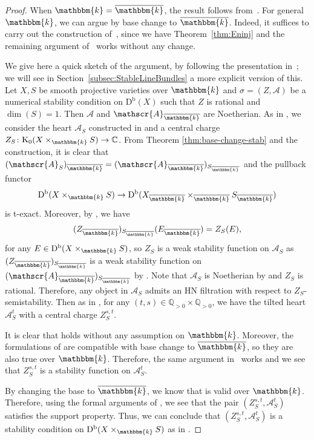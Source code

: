 \documentclass[11pt, reqno]{amsart}
\numberwithin{equation}{section}
\theoremstyle{plain}
\theoremstyle{remark}
\theoremstyle{definition}
\theoremstyle{italicsname}
\newcommand{\Db}{\mathrm{D^b}}
\newcommand{\cA}{\mathscr{A}}
\newcommand{\rK}{\mathrm{K}}
\newcommand{\KK}{\mathbbm{k}}
\def\CC{\ensuremath{\mathbb{C}}}
\def\QQ{\ensuremath{\mathbb{Q}}}
\def\citestacks#1{\cite[\href{https://stacks.math.columbia.edu/tag/#1}{#1}]{stacks-project}}
\begin{document}
\begin{proof}
When $\KK=\overline{\KK}$, the result follows from~\cite{Liu:StabProd,curves}. 
For general $\KK$, we can argue by base change to $\overline{\KK}$. 
Indeed, it suffices to carry out the construction of~\cite[Theorem~5.9]{Liu:StabProd}, since we have Theorem~\ref{thm:Eninj} and the remaining argument of~\cite[Theorem~4.5]{curves} works without any change.

We give here a quick sketch of the argument, by following the presentation in~\cite{Liu:StabProd}; we will see in Section~\ref{subsec:StableLineBundles} a more explicit version of this.
Let $X, S$ be smooth projective varieties over $\KK$ and $\sigma=(Z,\cA)$ be a numerical stability condition on $\Db(X)$ such that $Z$ is rational and $\dim(S)=1$. Then $\cA$ and $\cA_{\overline{\KK}}$ are Noetherian. As in \cite[Theorem~3.3]{Liu:StabProd}, we consider the heart $\cA_S$ constructed in \cite[Theorem 3.3.6(ii)]{P-t-structures} and a central charge $Z_S\colon \rK_0(X\times_\KK S)\to \CC$. From Theorem \ref{thm:base-change-stab} and the construction, it is clear that $(\cA_S)_{\overline{\KK}}=(\cA_{\overline{\KK}})_{S_{\overline{\KK}}}$ and the pullback functor 
\[
\Db(X\times_\KK S)\to \Db(X_{\overline{\KK}}\times_{\overline{\KK}} S_{\overline{\KK}})
\]
is t-exact. Moreover, by \citestacks{0AA7}, we have 
\[
(Z_{\overline{\KK}})_{S_{\overline{\KK}}}(E_{\overline{\KK}})=Z_S(E),
\]
for any $E\in \Db(X\times_\KK S)$, so $Z_S$ is a weak stability function on $\cA_S$ as $(Z_{\overline{\KK}})_{S_{\overline{\KK}}}$ is a weak stability function on $(\cA_{\overline{\KK}})_{S_{\overline{\KK}}}$ by \cite[Theorem~3.3]{Liu:StabProd}. Note that $\cA_S$ is Noetherian by \cite[Theorem 3.3.6(i)]{P-t-structures} and $Z_S$ is rational. Therefore, any object in $\cA_S$ admits an HN filtration with respect to $Z_S$-semistability. Then as in \cite[Section~4]{Liu:StabProd}, for any $(t,s)\in \QQ_{>0}\times \QQ_{>0}$, we have the tilted heart $\cA^t_S$ with a central charge $Z^{s,t}_S$.

It is clear that \cite[Lemma~4.1]{Liu:StabProd} holds without any assumption on $\KK$. Moreover, the formulations of \cite[Lemma~4.2 and Lemma 4.3]{Liu:StabProd} are compatible with base change to $\overline{\KK}$, so they are also true over $\KK$. Therefore, the same argument in~\cite[Proposition 4.6]{Liu:StabProd} works and we see that $Z^{s,t}_S$ is a stability function on $\cA^t_S$.

By changing the base to $\overline{\KK}$, we know that \cite[Lemma~5.5]{Liu:StabProd} is valid over $\KK$. 
Therefore, using the formal arguments of \cite[Lemma~5.6 and Lemma 5.7]{Liu:StabProd}, we see that the pair $(Z^{s,t}_S,\cA^t_S)$ satisfies the support property. 
Thus, we can conclude that $(Z^{s,t}_S, \cA^t_S)$ is a stability condition on $\Db(X\times_\KK S)$ as in \cite[Theorem 4.7]{Liu:StabProd}.
\end{proof}
\end{document}
